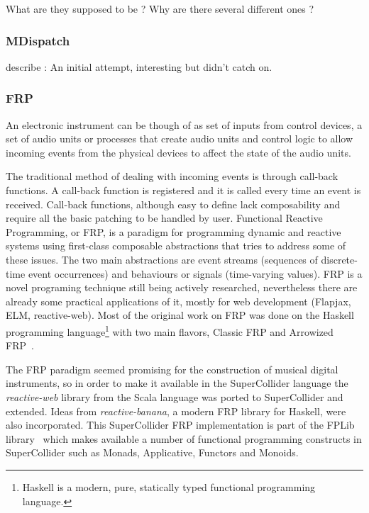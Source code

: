 \documentclass{article}
\begin{document}
What are they supposed to be ? Why are there several different ones ?	
	
\subsubsection{MDispatch}	

describe : An initial attempt, interesting but didn't catch on.
		
\subsubsection{FRP}

An electronic instrument can be though of as set of inputs from control devices, a set of audio units or processes that create audio units and control logic to allow incoming events from the physical devices to affect the state of the audio units. 

The traditional method of dealing with incoming events is through call-back functions. A call-back function is registered and it is called every time an event is received. Call-back functions, although easy to define lack composability and require all the basic patching to be handled by user. Functional Reactive Programming, or FRP, is a paradigm for programming dynamic and reactive systems using first-class composable abstractions that tries to address some of these issues. The two main abstractions are event streams (sequences of discrete-time event occurrences) and behaviours or signals (time-varying values). FRP is a novel programing technique still being actively researched, nevertheless there are already some practical applications of it, mostly for web development (Flapjax, ELM, reactive-web). Most of the original work on FRP was done on the Haskell programming language\footnote{Haskell is a modern, pure, statically typed functional programming language.} with two main flavors, Classic FRP\cite{elliott_functional_1997,elliott_push-pull_2009} and Arrowized FRP~\cite{hudak_arrows_2003}.

The FRP paradigm seemed promising for the construction of musical digital instruments, so in order to make it available in the SuperCollider language the \emph{reactive-web} library from the Scala language was ported to SuperCollider and extended. Ideas from \emph{reactive-banana}, a modern FRP library for Haskell, were also incorporated. This SuperCollider FRP implementation is part of the FPLib library~\cite{-fpl} which makes available a number of functional programming constructs in SuperCollider such as Monads, Applicative, Functors and Monoids.
 
\end{document}
